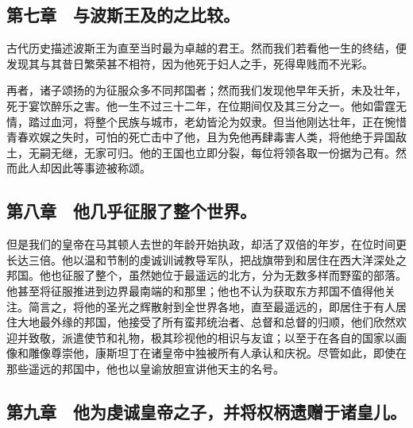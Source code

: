 \subsection{第七章　与波斯王及的之比较。}

古代历史描述波斯王为直至当时最为卓越的君王。然而我们若看他一生的终结，便发现其与其昔日繁荣甚不相符，因为他死于妇人之手，死得卑贱而不光彩。\par

再者，诸子颂扬的为征服众多不同邦国者；然而我们发现他早年夭折，未及壮年，死于宴饮醉乐之害。他一生不过三十二年，在位期间仅及其三分之一。他如雷霆无情，踏过血河，将整个民族与城市，老幼皆沦为奴隶。但当他刚达壮年，正在惋惜青春欢娱之失时，可怕的死亡击中了他，且为免他再肆毒害人类，将他绝于异国敌土，无嗣无继，无家可归。他的王国也立即分裂，每位将领各取一份据为己有。然而此人却因此等事迹被称颂。\par


\subsection{第八章　他几乎征服了整个世界。}

但是我们的皇帝在马其顿人去世的年龄开始执政，却活了双倍的年岁，在位时间更长达三倍。他以温和节制的虔诚训诫教导军队，把战旗带到和居住在西大洋深处之邦国。他也征服了整个，虽然她位于最遥远的北方，分为无数多样而野蛮的部落。他甚至将征服推进到边界最南端的和那里；他也不认为获取东方邦国不值得他关注。简言之，将他的圣光之辉散射到全世界各地，直至最遥远的，即居住于有人居住大地最外缘的邦国，他接受了所有蛮邦统治者、总督和总督的归顺，他们欣然欢迎并致敬，派遣使节和礼物，极其珍视他的相识与友谊；以至于在各自的国家以画像和雕像尊崇他，康斯坦丁在诸皇帝中独被所有人承认和庆祝。尽管如此，即使在那些遥远的邦国中，他也以皇谕放胆宣讲他天主的名号。\par


\subsection{第九章　他为虔诚皇帝之子，并将权柄遗赠于诸皇儿。}

